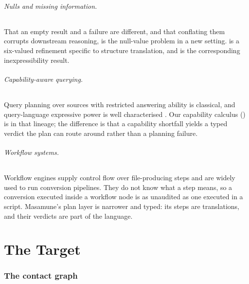 \documentclass[11pt,twocolumn,a4paper]{article}
\theoremstyle{msthm}
\theoremstyle{definition}
\theoremstyle{remark}
\begin{document}
\paragraph{Nulls and missing information.} That an empty result and a
failure are different, and that conflating them corrupts downstream
reasoning, is the null-value problem
\citep{codd1979extending,imielinski1984incomplete,libkin2016sql} in a
new setting.  is a six-valued refinement specific to
structure translation, and  is the corresponding
inexpressibility result.

\paragraph{Capability-aware querying.} Query planning over sources with
restricted answering ability is classical, and query-language expressive
power is well characterised
\citep{perez2009sparql,angles2017foundations}. Our capability calculus
() is in that lineage; the difference is that a
capability shortfall yields a typed verdict the plan can route around
rather than a planning failure.

\paragraph{Workflow systems.} Workflow engines
\citep{koster2012snakemake,ditommaso2017nextflow} supply control flow
over file-producing steps and are widely used to run conversion
pipelines. They do not know what a step means, so a conversion executed
inside a workflow node is as unaudited as one executed in a script.
Masamune's plan layer is narrower and typed: its steps are translations,
and their verdicts are part of the language.

\part{The Target}

\section{The contact graph}
\label{sec:graph}
\end{document}

